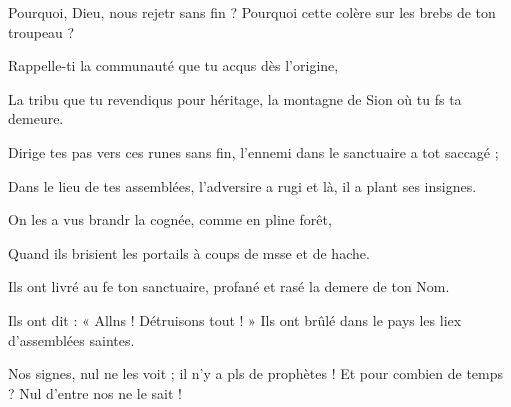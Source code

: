 \item Pourquoi, Dieu, nous rejetr sans fin ?\psstar{} Pourquoi cette colère sur les brebs de ton troupeau ?
\item Rappelle-ti la communauté\psstar{} que tu acqus dès l’origine,
\item La tribu que tu revendiqus pour héritage,\psstar{} la montagne de Sion où tu fs ta demeure.
\item Dirige tes pas vers ces runes sans fin,\psstar{} l’ennemi dans le sanctuaire a tot saccagé ;
\item Dans le lieu de tes assemblées, l’adversire a rugi\psstar{} et là, il a plant ses insignes.
\item On les a vus brandr la cognée,\psstar{} comme en pline forêt,
\item Quand ils brisient les portails\psstar{} à coups de msse et de hache.
\item Ils ont livré au fe ton sanctuaire,\psstar{} profané et rasé la demere de ton Nom.
\item Ils ont dit : « Allns ! Détruisons tout ! »\psstar{} Ils ont brûlé dans le pays les liex d’assemblées saintes.
\item Nos signes, nul ne les voit ; il n’y a pls de prophètes !\psstar{} Et pour combien de temps ? Nul d’entre nos ne le sait !